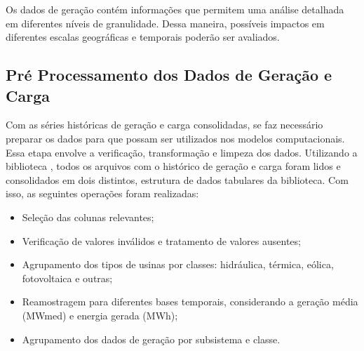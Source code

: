 \begin{table}[htb]
  \centering
    {
    }
\end{table}

Os dados de geração contém informações que permitem uma análise detalhada em diferentes níveis de granulidade. Dessa maneira, 
possíveis impactos em diferentes escalas geográficas e temporais poderão ser avaliados.

\subsection{Pré Processamento dos Dados de Geração e Carga} %
Com as séries históricas de geração e carga consolidadas, se faz necessário preparar os dados para que possam ser utilizados 
nos modelos computacionais. Essa etapa envolve a verificação, transformação e limpeza dos dados. Utilizando a biblioteca
, todos os arquivos com o histórico de geração e carga foram lidos e consolidados em dois  
distintos, estrutura de dados tabulares da biblioteca. Com isso, as seguintes operações foram realizadas:
\begin{itemize}
    \item Seleção das colunas relevantes;
    \item Verificação de valores inválidos e tratamento de valores ausentes;
    \item Agrupamento dos tipos de usinas por classes: hidráulica, térmica, eólica, fotovoltaica e outras;
    \item Reamostragem para diferentes bases temporais, considerando a geração média (MWmed) e energia gerada (MWh);
    \item Agrupamento dos dados de geração por subsistema e classe.
\end{itemize}

